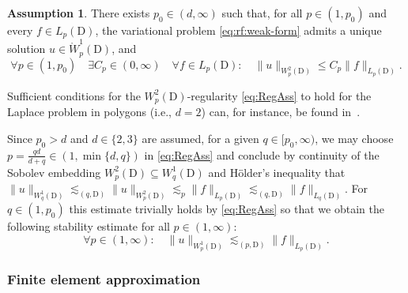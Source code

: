 \documentclass[reqno]{amsart}
\numberwithin{equation}{section}
\newcommand{\norm}[2]{     \| #1       \|_{ #2 }}
\newcommand{\dom}{\mathrm{D}}
\newcommand{\Wo}{\mathring{W}}
\theoremstyle{remark}
\theoremstyle{definition}
\newtheorem{assumption}[lemma]{Assumption}
\begin{document}
\begin{assumption}\label{assumption:regularity}
	There exists $p_0\in(d,\infty)$
	such that, for all $p\in(1,p_0)$ 
	and every $f\in L_p(\dom)$, 
	the variational problem 
	\eqref{eq:rf:weak-form} 
	admits a unique solution $u\in\Wo^1_p(\dom)$, and 
	\begin{equation}\label{eq:RegAss}
	\forall p\in(1,p_0) 
	\quad 
	\exists C_p \in (0,\infty) 
	\quad 
	\forall f\in L_p(\dom) : 
	\quad 
	\norm{ u }{W^2_p(\dom)} 
	\leq 
	C_p 
	\norm{ f }{L_p(\dom)} 
	. 
	\end{equation}
\end{assumption} 

Sufficient conditions for the 
$W^2_p(\dom)$-regularity \eqref{eq:RegAss}
to hold for the Laplace problem  
in polygons (i.e., $d=2$) 
can, for instance, be found 
in~\cite[Theorem~4.3.2.4]{Grisvard2011}. 


Since $p_0 > d$ and $d \in\{2,3\}$ are assumed, 
for a given $q \in [p_0,\infty)$,  
we may choose   
${p = \frac{qd}{d+q} \in ( 1, \min\{d,q\} )}$   
in \eqref{eq:RegAss} 
and conclude by continuity of the 
Sobolev embedding $W^2_p(\dom)\subseteq W^1_q(\dom)$ 
and H\"older's inequality that 
$\norm{ u }{W^1_q(\dom)} 
\lesssim_{(q,\dom)} 
\norm{ u }{W^2_p(\dom)} 
\lesssim_{p} 
\norm{ f }{L_p(\dom)} 
\lesssim_{(q,\dom)}
\norm{ f }{L_q(\dom)}$. 
For $q\in(1,p_0)$ this estimate 
trivially holds by \eqref{eq:RegAss} 
so that we obtain the 
following stability estimate 
for all $p\in(1,\infty)$: 
%
\begin{equation}\label{eq:rf:stab-u}
\forall p\in(1,\infty): 
\quad 
\norm{ u }{W^1_p(\dom)} 
\lesssim_{(p,\dom)} 
\norm{ f }{L_p(\dom)}. 
\end{equation}


\subsubsection{Finite element approximation} 
\label{subsubsec:rf:FEM} 
\end{document}
